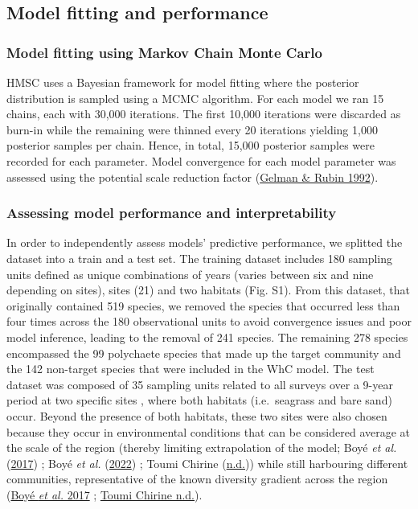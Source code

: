 \documentclass[9pt,biorxiv,doublespacing,lineno]{lapreprint}
\begin{document}
\hypertarget{model-fitting-and-performance}{%
\subsection{Model fitting and
performance}\label{model-fitting-and-performance}}

\hypertarget{model-fitting-using-markov-chain-monte-carlo}{%
\subsubsection{Model fitting using Markov Chain Monte
Carlo}\label{model-fitting-using-markov-chain-monte-carlo}}

HMSC uses a Bayesian framework for model fitting where the posterior
distribution is sampled using a MCMC algorithm. For each model we ran 15
chains, each with 30,000 iterations. The first 10,000 iterations were
discarded as burn-in while the remaining were thinned every 20
iterations yielding 1,000 posterior samples per chain. Hence, in total,
15,000 posterior samples were recorded for each parameter. Model
convergence for each model parameter was assessed using the potential
scale reduction factor (\protect\hyperlink{ref-Gelman_1992}{Gelman \&
Rubin 1992}).

\hypertarget{assessing-model-performance-and-interpretability}{%
\subsubsection{Assessing model performance and
interpretability}\label{assessing-model-performance-and-interpretability}}

In order to independently assess models' predictive performance, we
splitted the dataset into a train and a test set. The training dataset
includes 180 sampling units defined as unique combinations of years
(varies between six and nine depending on sites), sites (21) and two
habitats (Fig. S1). From this dataset, that originally contained 519
species, we removed the species that occurred less than four times
across the 180 observational units to avoid convergence issues and poor
model inference, leading to the removal of 241 species. The remaining
278 species encompassed the 99 polychaete species that made up the
target community and the 142 non-target species that were included in
the WhC model. The test dataset was composed of 35 sampling units
related to all surveys over a 9-year period at two specific sites ,
where both habitats (i.e.~seagrass and bare sand) occur. Beyond the
presence of both habitats, these two sites were also chosen because they
occur in environmental conditions that can be considered average at the
scale of the region (thereby limiting extrapolation of the model; Boyé
\emph{et al.} (\protect\hyperlink{ref-Boye_2017}{2017}) ; Boyé \emph{et
al.} (\protect\hyperlink{ref-Boye_2022}{2022}) ; Toumi Chirine
(\protect\hyperlink{ref-Toumi_nd}{n.d.})) while still harbouring
different communities, representative of the known diversity gradient
across the region (\protect\hyperlink{ref-Boye_2017}{Boyé \emph{et al.}
2017} ; \protect\hyperlink{ref-Toumi_nd}{Toumi Chirine n.d.}).
\end{document}
